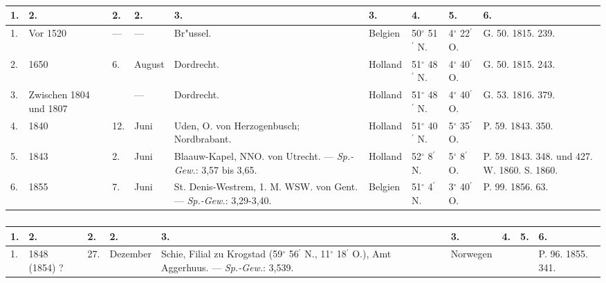 \documentclass[a4paper, 8pt, oneside, polutonikogreek, german]{article}
\begin{document}
\subsubsection{}
\begin{table}[H]
    \centering
    \frakfamily
    \footnotesize
    \begin{longtable}{|p{3mm}|p{10mm}|p{5mm}|p{9mm}|p{25mm}|p{13mm}|p{11mm}|p{11mm}|p{18mm}|}
    \hline
        1. & 2. & 2. & 2. & 3. & 3. & 4. & 5. & 6. \\ \hline
        1. & Vor 1520 & --- & --- & Br"ussel. & Belgien & 50$^\circ$ 51$^\prime$ N. & 4$^\circ$ 22$^\prime$ O. & G. 50. 1815. 239. \\ \hline
        2. & 1650 & 6. & August & Dordrecht. & Holland & 51$^\circ$ 48$^\prime$ N. & 4$^\circ$ 40$^\prime$ O. & G. 50. 1815. 243. \\ \hline
        3. & Zwischen 1804 und 1807 & ~ & --- & Dordrecht. & Holland & 51$^\circ$ 48$^\prime$ N. & 4$^\circ$ 40$^\prime$ O. & G. 53. 1816. 379. \\ \hline
        4. & 1840 & 12. & Juni & Uden, O. von Herzogenbusch; Nordbrabant. & Holland & 51$^\circ$ 40$^\prime$ N. & 5$^\circ$ 35$^\prime$ O. & P. 59. 1843. 350. \\ \hline
        5. & 1843 & 2. & Juni & Blaauw-Kapel, NNO. von Utrecht. --- \emph{Sp.-Gew.}: 3,57 bis 3,65. & Holland & 52$^\circ$ 8$^\prime$ N. & 5$^\circ$ 8$^\prime$ O. & P. 59. 1843. 348. und 427. W. 1860. S. 1860. \\ \hline
        6. & 1855 & 7. & Juni & St. Denis-Westrem, 1. M. WSW. von Gent. --- \emph{Sp.-Gew.}: 3,29-3,40. & Belgien & 51$^\circ$ 4$^\prime$ N. & 3$^\circ$ 40$^\prime$ O. & P. 99. 1856. 63. \\ \hline
    \end{longtable}
\end{table}
\subsubsection{}
\begin{table}[H]
    \centering
    \frakfamily
    \footnotesize
    \begin{longtable}{|l|p{17mm}|l|l|p{30mm}|l|l|l|p{13mm}|}
    \hline
        1. & 2. & 2. & 2. & 3. & 3. & 4. & 5. & 6. \\ \hline
        1. & 1848 (1854) ? & 27. & Dezember & Schie, Filial zu Krogstad (59$^\circ$ 56$^\prime$ N., 11$^\circ$ 18$^\prime$ O.), Amt Aggerhuus. --- \emph{Sp.-Gew.}: 3,539. & Norwegen & ~ & ~ & P. 96. 1855. 341. \\ \hline
    \end{longtable}
\end{table}
\end{document}
